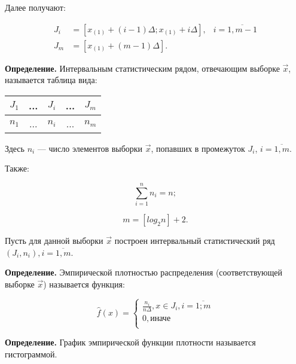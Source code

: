 Далее получают:

\begin{equation}\label{eq:07}
    \begin{aligned}
        J_i &= [x_{(1)} + (i - 1) \Delta; x_{(1)} + i \Delta],
        & i = \overline{1, m-1}\\
        J_m &= [x_{(1)} + (m - 1) \Delta].
    \end{aligned}
\end{equation}

\textbf{Определение.} Интервальным статистическим рядом, отвечающим
выборке $\vec{x}$, называется таблица вида:

\begin{table}[htb]
    \centering
    \begin{tabular}{|c|c|c|c|c|}
        \hline
        $J_1$ & ... & $J_i$ & ... & $J_m$ \\
        \hline
        $n_1$ & ... & $n_i$ & ... & $n_m$ \\
        \hline
    \end{tabular}
\end{table}

Здесь $n_i$ --- число элементов выборки $\vec{x}$, попавших в промежуток $J_i$,
$i= \overline{1,m}$.

Также:

\begin{equation}\label{eq:08}
    \sum_{i=1}^{n} n_i = n;
\end{equation}

\begin{equation}\label{eq:09}
    m = [log_2 n] + 2.
\end{equation}

Пусть для данной выборки $\vec{x}$ построен интервальный статистический
ряд~$(J_i, n_i), i=\overline{1,m}$.

\textbf{Определение.} Эмпирической плотностью распределения (соответствующей
выборке $\vec{x}$) называется функция:

\begin{equation}
    \hat f(x) =
    \begin{cases}
        \frac{n_i}{n \Delta}, x \in J_i, i = \overline{1; m} \\
        0, \text{иначе} \\
    \end{cases}
\end{equation}

\textbf{Определение.} График эмпирической функции плотности называется
гистограммой.

